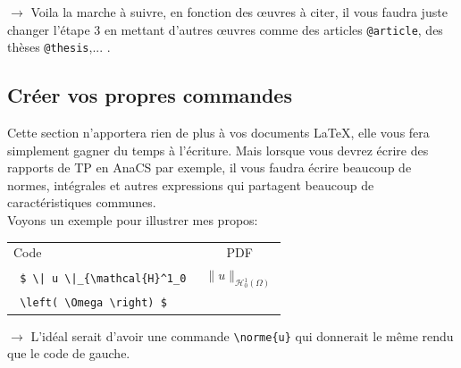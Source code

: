 \documentclass[11pt]{article}				%
\begin{document}
\begin{figure}[h!]
	\centering
	 \hfill

\end{figure}

$\rightarrow$ Voila la marche à suivre, en fonction des œuvres à citer, il vous faudra juste changer l'étape 3 en mettant d'autres œuvres comme des articles \verb|@article|, des thèses \verb|@thesis|,... .

\newpage

\subsection*{Créer vos propres commandes}

Cette section n'apportera rien de plus à vos documents LaTeX, elle vous fera simplement gagner du temps à l'écriture. Mais lorsque vous devrez écrire des rapports de TP en AnaCS par exemple, il vous faudra écrire beaucoup de normes, intégrales et autres expressions qui partagent beaucoup de caractéristiques communes.\\

Voyons un exemple pour illustrer mes propos:\\


\begin{multicols}{2}
	\begin{tabular}{l|c}
Code	&  PDF \\ 
\verb? $ \| u \|_{\mathcal{H}^1_0 ? &  \( \| u \|_{\mathcal{H}^1_0 \left( \Omega \right) } \)  \\
	\verb? \left( \Omega \right) $?   &  
\end{tabular}

\columnbreak

$\rightarrow$ L'idéal serait d'avoir une commande \verb|\norme{u}| qui donnerait le même rendu que le code de gauche.
\end{multicols} 
\end{document}
